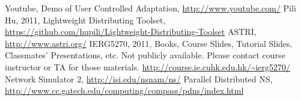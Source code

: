 Youtube, Demo of User Controlled Adaptation, 
	\url{http://www.youtube.com/}
 Pili Hu, 2011, Lightweight Distributing Toolset, 
	\url{https://github.com/hupili/Lightweight-Distributing-Toolset}
 ASTRI, 
	\url{http://www.astri.org/}
 IERG5270, 2011, Books, Course Slides, Tutorial Slides, 
	Classmates' Presentations, etc. Not publicly available. Please 
	contact course instructor or TA for those materials.  
	\url{http://course.ie.cuhk.edu.hk/~ierg5270/}
 Network Simulator 2, 
	\url{http://isi.edu/nsnam/ns/}
 Parallel Distributed NS, 
	\url{http://www.cc.gatech.edu/computing/compass/pdns/index.html}